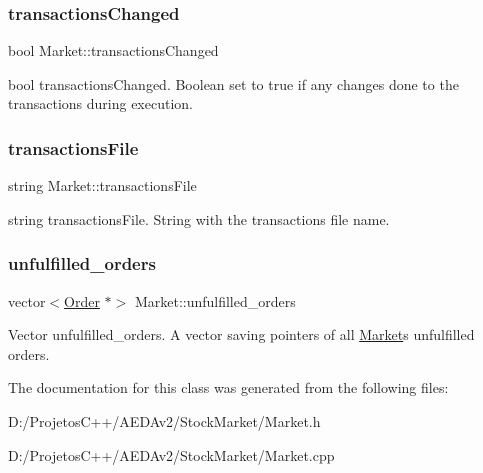 \subsubsection{\texorpdfstring{transactions\+Changed}{transactionsChanged}}
{\footnotesize\ttfamily bool Market\+::transactions\+Changed\hspace{0.3cm}{\ttfamily [private]}}

bool transactions\+Changed. Boolean set to true if any changes done to the transactions during execution. \mbox{\label{class_market_ae4a312dda682ea7048214886b513b8e8}} 
\subsubsection{\texorpdfstring{transactions\+File}{transactionsFile}}
{\footnotesize\ttfamily string Market\+::transactions\+File\hspace{0.3cm}{\ttfamily [private]}}

string transactions\+File. String with the transaction\textquotesingle{}s file name. \mbox{\label{class_market_a01f48cd85dcba282896c52c86f282e62}} 
\subsubsection{\texorpdfstring{unfulfilled\+\_\+orders}{unfulfilled\_orders}}
{\footnotesize\ttfamily vector$<$\hyperlink{class_order}{Order} $\ast$$>$ Market\+::unfulfilled\+\_\+orders\hspace{0.3cm}{\ttfamily [private]}}

Vector unfulfilled\+\_\+orders. A vector saving pointers of all \hyperlink{class_market}{Market}\textquotesingle{}s unfulfilled orders. 

The documentation for this class was generated from the following files\+:\begin{DoxyCompactItemize}
\item 
D\+:/\+Projetos\+C++/\+A\+E\+D\+Av2/\+Stock\+Market/Market.\+h\item 
D\+:/\+Projetos\+C++/\+A\+E\+D\+Av2/\+Stock\+Market/Market.\+cpp\end{DoxyCompactItemize}
